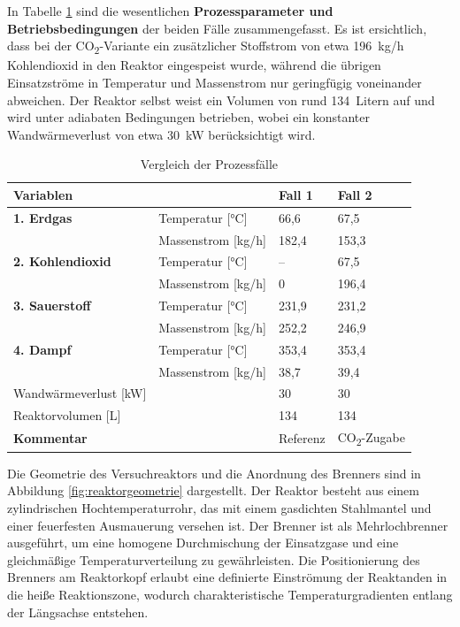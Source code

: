         In Tabelle \ref{tab:rahmenbedingungen_versuche} sind die wesentlichen \textbf{Prozessparameter und Betriebsbedingungen} der beiden Fälle zusammengefasst. Es ist ersichtlich, dass bei der CO\textsubscript{2}-Variante ein zusätzlicher Stoffstrom von etwa 196~kg/h Kohlendioxid in den Reaktor eingespeist wurde, während die übrigen Einsatzströme in Temperatur und Massenstrom nur geringfügig voneinander abweichen. Der Reaktor selbst weist ein Volumen von rund 134~Litern auf und wird unter adiabaten Bedingungen betrieben, wobei ein konstanter Wandwärmeverlust von etwa 30~kW berücksichtigt wird.
        
        \begin{table}[H]
            \centering
            \caption{Vergleich der Prozessfälle \cite{gonzales}}
            \label{tab:rahmenbedingungen_versuche}
            \begin{tabular}{llll}
            \toprule
            \textbf{Variablen} & & \textbf{Fall 1} & \textbf{Fall 2} \\
            \midrule
            \textbf{1. Erdgas} & Temperatur [°C] & 66,6 & 67,5 \\
                               & Massenstrom [kg/h] & 182,4 & 153,3 \\
            \midrule
            \textbf{2. Kohlendioxid} & Temperatur [°C] & -- & 67,5 \\
                                     & Massenstrom [kg/h] & 0 & 196,4 \\
            \midrule
            \textbf{3. Sauerstoff} & Temperatur [°C] & 231,9 & 231,2 \\
                                   & Massenstrom [kg/h] & 252,2 & 246,9 \\
            \midrule
            \textbf{4. Dampf} & Temperatur [°C] & 353,4 & 353,4 \\
                              & Massenstrom [kg/h] & 38,7 & 39,4 \\
            \midrule
            Wandwärmeverlust [kW] & & 30 & 30 \\
            Reaktorvolumen [L] & & 134 & 134 \\
            \midrule
            \textbf{Kommentar} & & Referenz & CO\textsubscript{2}-Zugabe \\
            \bottomrule
            \end{tabular}
        \end{table}
        
        Die Geometrie des Versuchreaktors und die Anordnung des Brenners sind in Abbildung \ref{fig:reaktorgeometrie} dargestellt. Der Reaktor besteht aus einem zylindrischen Hochtemperaturrohr, das mit einem gasdichten Stahlmantel und einer feuerfesten Ausmauerung versehen ist. Der Brenner ist als Mehrlochbrenner ausgeführt, um eine homogene Durchmischung der Einsatzgase und eine gleichmäßige Temperaturverteilung zu gewährleisten. Die Positionierung des Brenners am Reaktorkopf erlaubt eine definierte Einströmung der Reaktanden in die heiße Reaktionszone, wodurch charakteristische Temperaturgradienten entlang der Längsachse entstehen.
        
